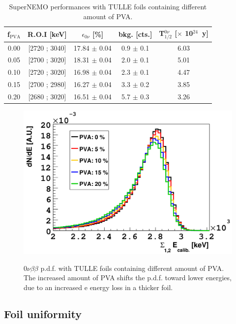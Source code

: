 \documentclass[main.tex]{subfiles}
\begin{document}
\begin{table}
\centering
\begin{tabular}{c|c|c|c|c}
\toprule
f$_{\text{PVA}}$ & R.O.I [keV] & $\epsilon_{\text{0}\nu}$ [\%] & bkg. [cts.] &   T$_{\text{1/2}}^{\text{0}\nu}$ [$\times$ 10$^{\text{24}}$~y] \\[0.1cm]
\hline
0.00 & [2720 ; 3040] & 17.84 $\pm$ 0.04 & 0.9 $\pm$ 0.1 & 6.03 \\ [0.1cm]
\hline
0.05 & [2700 ; 3020] & 18.31 $\pm$ 0.04 & 2.0 $\pm$ 0.1 & 5.01 \\ [0.1cm]
\hline
0.10 & [2720 ; 3020] & 16.98 $\pm$ 0.04 & 2.3 $\pm$ 0.1 & 4.47 \\ [0.1cm]
\hline
0.15 & [2700 ; 2980] & 16.27 $\pm$ 0.04 & 3.3 $\pm$ 0.2 & 3.85 \\ [0.1cm]
\hline
0.20 & [2680 ; 3020] & 16.51 $\pm$ 0.04 & 5.7 $\pm$ 0.3 & 3.26 \\ [0.1cm]
\bottomrule
\end{tabular}
\caption{SuperNEMO performances with TULLE foils containing different amount of PVA.}
\label{Tab:AmountOfPVA}
\end{table}


\begin{figure}[h!]
\centering
\includegraphics[scale=0.25]{pictures/Chap4/SpectrumPVA.png}
\label{SpectrumPVA.png}
\caption{0$\nu\beta\beta$ p.d.f. with TULLE foils containing different amount of PVA. The increased amount of PVA shifts the p.d.f. toward lower energies, due to an increased e energy loss in a thicker foil.}
\end{figure}


\subsection{Foil uniformity}
\end{document}
